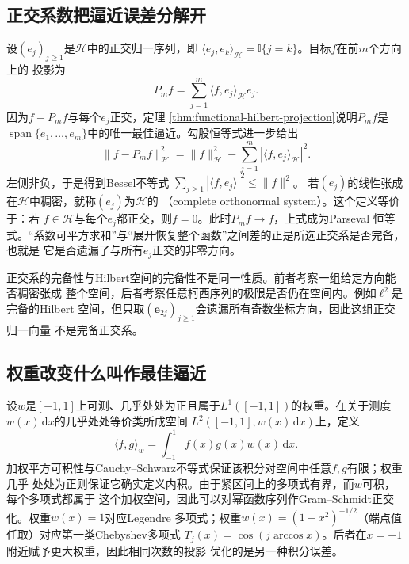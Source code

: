 \subsection{正交系数把逼近误差分解开}

设$(e_j)_{j\geq1}$是$\mathcal{H}$中的正交归一序列，即
$\langle e_j,e_k\rangle_{\mathcal{H}}=\mathbb{I}\{j=k\}$。目标$f$在前$m$个方向上的
投影为
\begin{equation}
  P_m f
  =
  \sum_{j=1}^{m}
  \langle f,e_j\rangle_{\mathcal{H}}e_j.
  \label{eq:functional-orthogonal-partial-projection}
\end{equation}
因为$f-P_mf$与每个$e_j$正交，定理
\ref{thm:functional-hilbert-projection}说明$P_mf$是
$\operatorname{span}\{e_1,\ldots,e_m\}$中的唯一最佳逼近。勾股恒等式进一步给出
\begin{equation}
  \lVert f-P_mf\rVert_{\mathcal{H}}^2
  =
  \lVert f\rVert_{\mathcal{H}}^2
  -
  \sum_{j=1}^{m}
  |\langle f,e_j\rangle_{\mathcal{H}}|^2.
  \label{eq:functional-projection-error-decomposition}
\end{equation}
左侧非负，于是得到Bessel不等式
$\sum_{j\geq1}|\langle f,e_j\rangle|^2\leq\lVert f\rVert^2$。
若$(e_j)$的线性张成在$\mathcal{H}$中稠密，就称$(e_j)$为$\mathcal{H}$的
（complete orthonormal system）。这个定义等价于：若
$f\in\mathcal{H}$与每个$e_j$都正交，则$f=0$。此时$P_mf\to f$，上式成为Parseval
恒等式。“系数可平方求和”与“展开恢复整个函数”之间差的正是所选正交系是否完备，也就是
它是否遗漏了与所有$e_j$正交的非零方向。

正交系的完备性与Hilbert空间的完备性不是同一性质。前者考察一组给定方向能否稠密张成
整个空间，后者考察任意柯西序列的极限是否仍在空间内。例如$\ell^2$是完备的Hilbert
空间，但只取$(\bm{e}_{2j})_{j\geq1}$会遗漏所有奇数坐标方向，因此这组正交归一向量
不是完备正交系。

\subsection{权重改变什么叫作最佳逼近}

设$w$是$[-1,1]$上可测、几乎处处为正且属于$L^1([-1,1])$的权重。在关于测度
$w(x)\,\mathrm{d}x$的几乎处处等价类所成空间
$L^2([-1,1],w(x)\,\mathrm{d}x)$上，定义
\[
  \langle f,g\rangle_w
  =
  \int_{-1}^{1}f(x)g(x)w(x)\,\mathrm{d}x.
\]
加权平方可积性与Cauchy--Schwarz不等式保证该积分对空间中任意$f,g$有限；权重几乎
处处为正则保证它确实定义内积。由于紧区间上的多项式有界，而$w$可积，每个多项式都属于
这个加权空间，因此可以对幂函数序列作Gram--Schmidt正交化。权重$w(x)=1$对应Legendre
多项式；权重$w(x)=(1-x^2)^{-1/2}$（端点值任取）对应第一类Chebyshev多项式
$T_j(x)=\cos(j\arccos x)$。后者在$x=\pm1$附近赋予更大权重，因此相同次数的投影
优化的是另一种积分误差。

